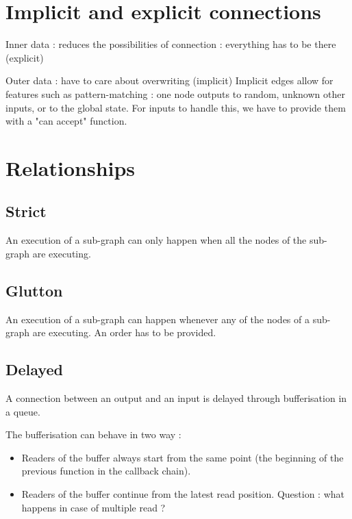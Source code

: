 \documentclass{article}
\begin{document}

	
	\section{Implicit and explicit connections}
	Inner data : reduces the possibilities of connection : everything has to be there (explicit)
	
	Outer data : have to care about overwriting (implicit)
    Implicit edges allow for features such as pattern-matching : one node outputs to random, unknown other inputs, or to 
    the global state.
    For inputs to handle this, we have to provide them with a "can accept" function.
	
    
	\section{Relationships}
    \subsection{Strict}
    An execution of a sub-graph can only happen when all the nodes of the sub-graph are executing.
    
	\subsection{Glutton}
	An execution of a sub-graph can happen whenever any of the nodes of a sub-graph are executing. 
	An order has to be provided.
    
    
	\subsection{Delayed}
	A connection between an output and an input is delayed through bufferisation in a queue.
	
	The bufferisation can behave in two way :
	\begin{itemize}
		\item Readers of the buffer always start from the same point (the beginning of the previous function in the callback chain).
		\item Readers of the buffer continue from the latest read position.
		Question : what happens in case of multiple read ?
	\end{itemize}
	
\end{document}
